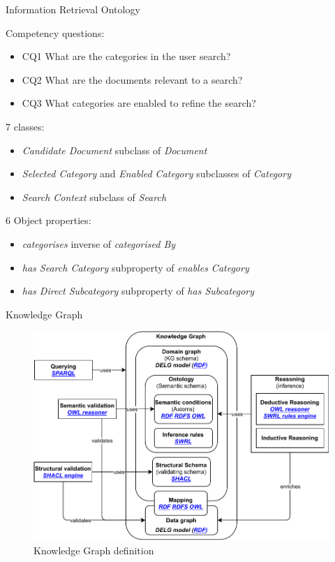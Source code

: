 \begin{frame}{Information Retrieval Ontology}

    Competency questions:
    \begin{itemize}
        \item CQ1 What are the categories in the user search?
        \item CQ2 What are the documents relevant to a search?
        \item CQ3 What categories are enabled to refine the search?
    \end{itemize}

    7 classes:
    \begin{itemize}
        \item \emph{Candidate Document} subclass of \emph{Document} 
        \item \emph{Selected Category} and \emph{Enabled Category} subclasses of \emph{Category}
        \item \emph{Search Context} subclass of \emph{Search}
    \end{itemize}

    6 Object properties:
    \begin{itemize}
        \item \emph{categorises} inverse of \emph{categorised By}
        \item \emph{has Search Category} subproperty of \emph{enables Category}
        \item \emph{has Direct Subcategory} subproperty of \emph{has Subcategory}
    \end{itemize}

\end{frame}

\begin{frame}{Knowledge Graph}

    \begin{figure} [H]
        \begin{center}
            \includegraphics[scale=0.6]{images/manuscript-chap1-summary-technos.pdf} 
            \caption{Knowledge Graph definition} 
        \end{center}
    \end{figure}

\end{frame}

